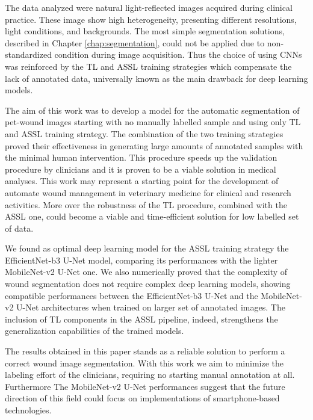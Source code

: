 \documentclass[../main.tex]{subfiles}
\begin{document}
The data analyzed were natural light-reflected images acquired during clinical practice.
These image show high heterogeneity, presenting different resolutions, light conditions, and backgrounds. 
The most simple segmentation solutions, described in Chapter \ref{chap:segmentation}, could not be applied due to non-standardized condition during image acquisition. Thus the choice of using CNNs was reinforced by the TL and ASSL training strategies which compensate the lack of annotated data, universally known as the main drawback for deep learning models.

The aim of this work was to develop a model for the automatic segmentation of pet-wound images starting with no manually labelled sample and using only TL and ASSL training strategy. 
The combination of the two training strategies proved their effectiveness in generating large amounts of annotated samples with the minimal human intervention. 
This procedure speeds up the validation procedure by clinicians and it is proven to be a viable solution in medical analyses.
This work may represent a starting point for the development of automate wound management in veterinary medicine for clinical and research activities. More over the robustness of the TL procedure, combined with the ASSL one, could become a viable and time-efficient solution for low labelled set of data.

We found as optimal deep learning model for the ASSL training strategy the EfficientNet-b3 U-Net model, comparing its performances with the lighter MobileNet-v2 U-Net one.
We also numerically proved that the complexity of wound segmentation does not require complex deep learning models, showing compatible performances between the EfficientNet-b3 U-Net and the MobileNet-v2 U-Net architectures when trained on larger set of annotated images. 
The inclusion of TL components in the ASSL pipeline, indeed, strengthens the generalization capabilities of the trained models.

The results obtained in this paper stands as a reliable solution to perform a correct wound image segmentation.  
With this work we aim to minimize the labeling effort of the clinicians, requiring no starting manual annotation at all. Furthermore The MobileNet-v2 U-Net performances suggest that the future direction of this field could focus on implementations of smartphone-based technologies. 
\end{document}
